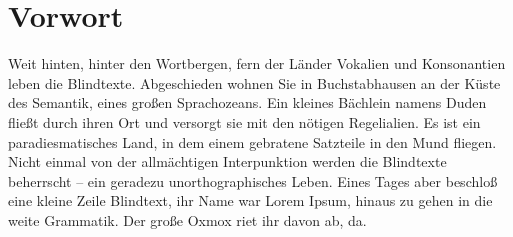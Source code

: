 \chapter*{Vorwort}\thispagestyle{rmplain}
\label{03_vorwort}
Weit hinten, hinter den Wortbergen, fern der Länder Vokalien und Konsonantien leben die Blindtexte. Abgeschieden wohnen Sie in Buchstabhausen an der Küste des Semantik, eines großen Sprachozeans. Ein kleines Bächlein namens Duden fließt durch ihren Ort und versorgt sie mit den nötigen Regelialien. Es ist ein paradiesmatisches Land, in dem einem gebratene Satzteile in den Mund fliegen. Nicht einmal von der allmächtigen Interpunktion werden die Blindtexte beherrscht – ein geradezu unorthographisches Leben. Eines Tages aber beschloß eine kleine Zeile Blindtext, ihr Name war Lorem Ipsum, hinaus zu gehen in die weite Grammatik. Der große Oxmox riet ihr davon ab, da.
\newpage

